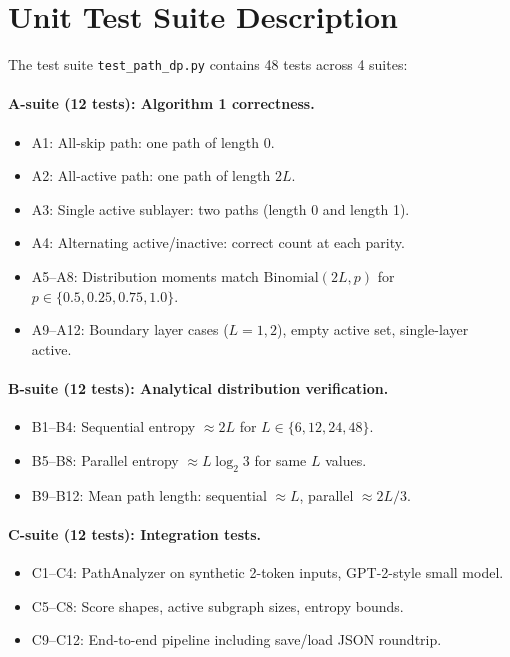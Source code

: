 \documentclass{article}
\begin{document}
\section{Unit Test Suite Description}
\label{app:tests}

The test suite \texttt{test\_path\_dp.py} contains 48 tests across 4 suites:

\paragraph{A-suite (12 tests): Algorithm 1 correctness.}
\begin{itemize}
  \item A1: All-skip path: one path of length 0.
  \item A2: All-active path: one path of length $2L$.
  \item A3: Single active sublayer: two paths (length 0 and length 1).
  \item A4: Alternating active/inactive: correct count at each parity.
  \item A5--A8: Distribution moments match $\mathrm{Binomial}(2L, p)$ for $p \in \{0.5, 0.25, 0.75, 1.0\}$.
  \item A9--A12: Boundary layer cases ($L=1, 2$), empty active set, single-layer active.
\end{itemize}

\paragraph{B-suite (12 tests): Analytical distribution verification.}
\begin{itemize}
  \item B1--B4: Sequential entropy $\approx 2L$ for $L \in \{6, 12, 24, 48\}$.
  \item B5--B8: Parallel entropy $\approx L\log_2 3$ for same $L$ values.
  \item B9--B12: Mean path length: sequential $\approx L$, parallel $\approx 2L/3$.
\end{itemize}

\paragraph{C-suite (12 tests): Integration tests.}
\begin{itemize}
  \item C1--C4: PathAnalyzer on synthetic 2-token inputs, GPT-2-style small model.
  \item C5--C8: Score shapes, active subgraph sizes, entropy bounds.
  \item C9--C12: End-to-end pipeline including save/load JSON roundtrip.
\end{itemize}
\end{document}

